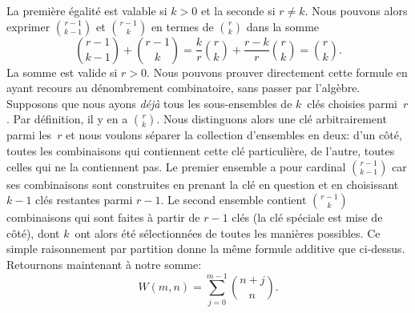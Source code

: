 La première égalité est valable si \(k > 0\) et la seconde si \(r \neq
k\). Nous pouvons alors exprimer \(\binom{r-1}{k-1}\) et
\(\binom{r-1}{k}\) en termes de \(\binom{r}{k}\) dans la somme
\begin{equation*}
\binom{r-1}{k-1} + \binom{r-1}{k} = \frac{k}{r}\binom{r}{k}
+ \frac{r-k}{r}\binom{r}{k} = \binom{r}{k}.
\end{equation*}
La somme est valide si \(r > 0\). Nous pouvons prouver directement
cette formule en ayant recours au dénombrement combinatoire, sans
passer par l'algèbre. Supposons que nous ayons \emph{déjà} tous les
sous-ensembles de \(k\)~clés choisies parmi~\(r\). Par définition, il
y en a \(\binom{r}{k}\). Nous distinguons alors une clé arbitrairement
parmi les~\(r\) et nous voulons séparer la collection d'ensembles en
deux: d'un côté, toutes les combinaisons qui contiennent cette clé
particulière, de l'autre, toutes celles qui ne la contiennent pas. Le
premier ensemble a pour cardinal \(\binom{r-1}{k-1}\) car ses
combinaisons sont construites en prenant la clé en question et en
choisissant \(k-1\) clés restantes parmi \(r-1\). Le second ensemble
contient \(\binom{r-1}{k}\) combinaisons qui sont faites à partir de
\(r-1\) clés (la clé spéciale est mise de côté), dont \(k\)~ont alors
été sélectionnées de toutes les manières possibles. Ce simple
raisonnement par partition donne la même formule additive que
ci-dessus. Retournons maintenant à notre somme:
\begin{equation*}
W(m,n) = \sum_{j=0}^{m-1}{\binom{n+j}{n}}.
\end{equation*}

